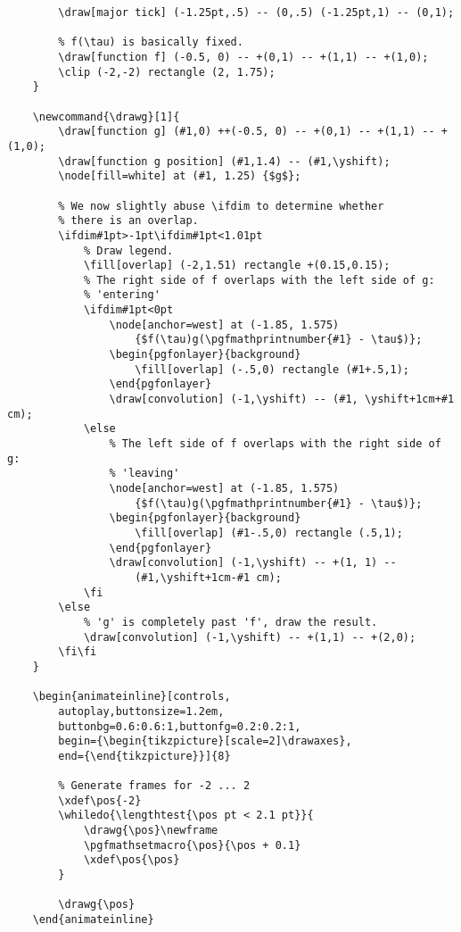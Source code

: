 \begin{lstlisting}
        \draw[major tick] (-1.25pt,.5) -- (0,.5) (-1.25pt,1) -- (0,1);

        % f(\tau) is basically fixed.
        \draw[function f] (-0.5, 0) -- +(0,1) -- +(1,1) -- +(1,0);
        \clip (-2,-2) rectangle (2, 1.75);
    }

    \newcommand{\drawg}[1]{
        \draw[function g] (#1,0) ++(-0.5, 0) -- +(0,1) -- +(1,1) -- +(1,0);
        \draw[function g position] (#1,1.4) -- (#1,\yshift);
        \node[fill=white] at (#1, 1.25) {$g$};

        % We now slightly abuse \ifdim to determine whether
        % there is an overlap.
        \ifdim#1pt>-1pt\ifdim#1pt<1.01pt
            % Draw legend.
            \fill[overlap] (-2,1.51) rectangle +(0.15,0.15);
            % The right side of f overlaps with the left side of g:
            % 'entering'
            \ifdim#1pt<0pt
                \node[anchor=west] at (-1.85, 1.575)
                    {$f(\tau)g(\pgfmathprintnumber{#1} - \tau$)};
                \begin{pgfonlayer}{background}
                    \fill[overlap] (-.5,0) rectangle (#1+.5,1);
                \end{pgfonlayer}
                \draw[convolution] (-1,\yshift) -- (#1, \yshift+1cm+#1 cm);
            \else
                % The left side of f overlaps with the right side of g:
                % 'leaving'
                \node[anchor=west] at (-1.85, 1.575)
                    {$f(\tau)g(\pgfmathprintnumber{#1} - \tau$)};
                \begin{pgfonlayer}{background}
                    \fill[overlap] (#1-.5,0) rectangle (.5,1);
                \end{pgfonlayer}
                \draw[convolution] (-1,\yshift) -- +(1, 1) --
                    (#1,\yshift+1cm-#1 cm);
            \fi
        \else
            % 'g' is completely past 'f', draw the result.
            \draw[convolution] (-1,\yshift) -- +(1,1) -- +(2,0);
        \fi\fi
    }

    \begin{animateinline}[controls,
        autoplay,buttonsize=1.2em,
        buttonbg=0.6:0.6:1,buttonfg=0.2:0.2:1,
        begin={\begin{tikzpicture}[scale=2]\drawaxes},
        end={\end{tikzpicture}}]{8}

        % Generate frames for -2 ... 2
        \xdef\pos{-2}
        \whiledo{\lengthtest{\pos pt < 2.1 pt}}{
            \drawg{\pos}\newframe
            \pgfmathsetmacro{\pos}{\pos + 0.1}
            \xdef\pos{\pos}
        }

        \drawg{\pos}
    \end{animateinline}
\end{lstlisting}
\normalsize

